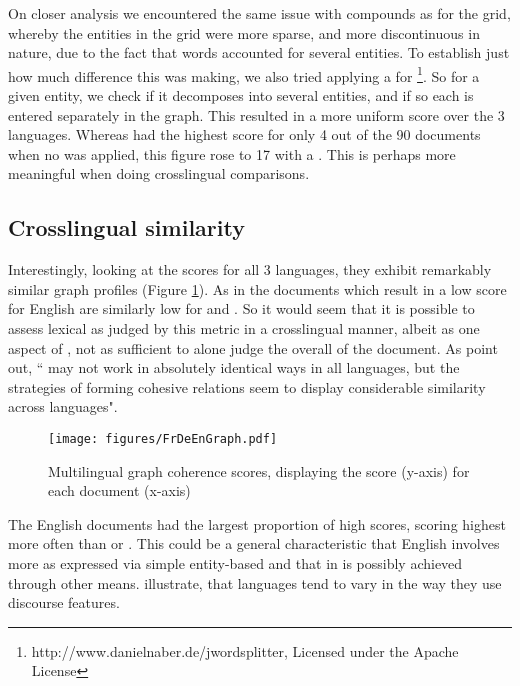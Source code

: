 \documentclass[output=paper]{langsci/langscibook.cls}
\begin{document}
On closer analysis we encountered the same issue with  compounds as for the grid, whereby the entities in the  grid were more sparse, and more discontinuous in nature, due to the fact that  words accounted for several entities. To establish just how much difference this was making, we also tried applying a  for \footnote{http://www.danielnaber.de/jwordsplitter, Licensed under the Apache License}. So for a given entity, we check if it decomposes into several entities, and if so each is entered separately in the graph. This resulted in a more uniform  score over the 3 languages. Whereas  had the highest  score for only 4 out of the 90 documents when no  was applied, this figure rose to 17 with a . This is perhaps more meaningful when doing crosslingual comparisons. 

\subsection{Crosslingual similarity}
Interestingly, looking at the  scores for all 3 languages, they exhibit remarkably similar graph profiles (Figure \ref{fig:FrDeEnGraph}). As in the documents which result in a low score for English are similarly low for  and . So it would seem that it is possible to assess lexical  as judged by this metric in a crosslingual manner, albeit as one aspect of , not as sufficient to alone judge the overall  of the document.
As \citet{tanskanen2006collaborating} %
point out, `` may not work in absolutely identical ways in all languages, but the strategies of forming cohesive relations seem to display considerable similarity across languages". 


\begin{figure}
\texttt{[image: figures/FrDeEnGraph.pdf]}
\caption{Multilingual graph coherence scores, displaying the score (y-axis) for each document (x-axis)}\label{fig:FrDeEnGraph}
\end{figure}

The English documents had the largest proportion of high  scores, scoring highest more often than  or . 
This could be a general characteristic that English involves more  as expressed via simple entity-based  and that in   is possibly achieved through other means.
\citet{lapshinova2015exploration} illustrate, that languages tend to vary in the way they use discourse features.
\end{document}
